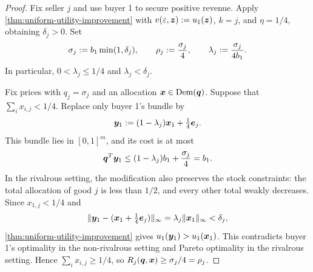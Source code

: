 \thmSecurity*
\begin{proof}
Fix seller $j$ and use buyer 1 to secure positive revenue.
Apply \cref{thm:uniform-utility-improvement} with
$v(\varepsilon, \bm{z}) := u_1(\bm{z})$, $k = j$, and $\eta = 1/4$, obtaining $\delta_j > 0$.
Set
\[ \sigma_j := b_1 \min(1, \delta_j), \qquad
   \rho_j := \frac{\sigma_j}{4}, \qquad
   \lambda_j := \frac{\sigma_j}{4b_1}. \]
In particular, $0 < \lambda_j \le 1/4$ and $\lambda_j < \delta_j$.

Fix prices with $q_j = \sigma_j$ and an allocation $\bm{x} \in \operatorname{Dem}(\bm{q})$.
Suppose that $\sum_i x_{i, j} < 1/4$.
Replace only buyer 1's bundle by
\[ \bm{y}_1 := (1 - \lambda_j)\bm{x}_1 + \tfrac{1}{4}\bm{e}_j. \]
This bundle lies in $[0, 1]^m$, and its cost is at most
\[ \bm{q}^T\bm{y}_1 \le (1 - \lambda_j)b_1 + \frac{\sigma_j}{4} = b_1. \]
In the rivalrous setting, the modification also preserves the stock constraints:
the total allocation of good $j$ is less than $1/2$, and every other total weakly decreases.
Since $x_{1, j} < 1/4$ and
\[ \lVert \bm{y}_1 - (\bm{x}_1 + \tfrac{1}{4}\bm{e}_j) \rVert_\infty
    = \lambda_j\lVert \bm{x}_1 \rVert_\infty < \delta_j, \]
\cref{thm:uniform-utility-improvement} gives $u_1(\bm{y}_1) > u_1(\bm{x}_1)$.
This contradicts buyer 1's optimality in the non-rivalrous setting
and Pareto optimality in the rivalrous setting.
Hence $\sum_i x_{i, j} \ge 1/4$, so $R_j(\bm{q}, \bm{x}) \ge \sigma_j/4 = \rho_j$.
\end{proof}

